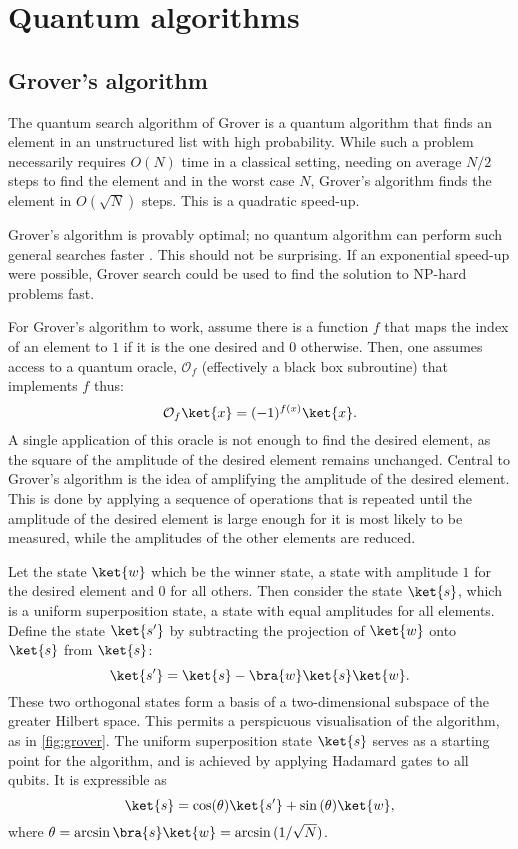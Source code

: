 \section{Quantum algorithms}

\subsection{Grover's algorithm}
The quantum search algorithm of Grover \cite{grover1996} is a quantum algorithm that finds an element in an unstructured list with high probability.
While such a problem necessarily requires $O(N)$ time in a classical setting, needing on average $N/2$ steps to find the element and in the worst case $N$, Grover's algorithm finds the element in $O(\sqrt{N})$ steps.
This is a quadratic speed-up.

Grover's algorithm is provably optimal; no quantum algorithm can perform such general searches faster \cite{zalka1999}.
This should not be surprising.
If an exponential speed-up were possible, Grover search could be used to find the solution to NP-hard problems fast.

For Grover's algorithm to work, assume there is a function $f$ that maps the index of an element to $1$ if it is the one desired and $0$ otherwise.
Then, one assumes access to a quantum oracle, $\mathcal{O}_f$
(effectively a black box subroutine) that implements $f$ thus:
\begin{equation}
    \label{eq:grover_oracle}
    \mathcal{O}_f \ket{x} = (-1)^{f(x)} \ket{x}.
\end{equation}
A single application of this oracle is not enough to find the desired element, as the square of the amplitude of the desired element remains unchanged.
Central to Grover's algorithm is the idea of amplifying the amplitude of the desired element.
This is done by applying a sequence of operations that is repeated until the amplitude of the desired element is large enough for it is most likely to be measured, while the amplitudes of the other elements are reduced.

Let the state $\ket{w}$ which be the winner state, a state with amplitude $1$ for the desired element and $0$ for all others.
Then consider the state $\ket{s}$, which is a uniform superposition state, a state with equal amplitudes for all elements.
Define the state $\ket{s'}$ by subtracting the projection of $\ket{w}$ onto $\ket{s}$ from $\ket{s}$:
\begin{equation}
    \label{eq:grover_s'}
    \ket{s'} = \ket{s} - \bra{w}\ket{s}\ket{w}.
\end{equation}
These two orthogonal states form a basis of a two-dimensional subspace of the greater Hilbert space.
This permits a perspicuous visualisation of the algorithm, as in \cref{fig:grover}.
The uniform superposition state $\ket{s}$ serves as a starting point for the algorithm, and is achieved by applying Hadamard gates to all qubits.
It is expressible as
\begin{equation}
    \ket{s} = \cos(\theta)\ket{s'} + \sin{(\theta)}\ket{w},
\end{equation}
where $\theta=\arcsin\bra{s}\ket{w}=\arcsin{}(1/\sqrt{N})$.

